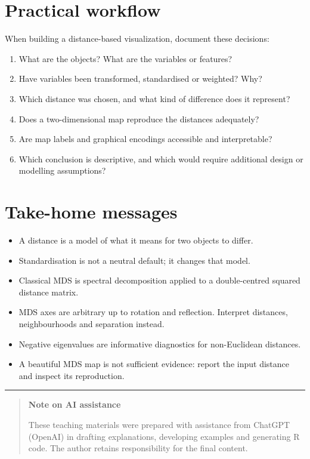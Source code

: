 \documentclass[
  english,
]{article}
\providecommand{\tightlist}{%
  \setlength{\itemsep}{0pt}\setlength{\parskip}{0pt}}
\begin{document}
\section{Practical workflow}\label{practical-workflow}

When building a distance-based visualization, document these decisions:

\begin{enumerate}
\def\labelenumi{\arabic{enumi}.}
\tightlist
\item
  What are the objects? What are the variables or features?
\item
  Have variables been transformed, standardised or weighted? Why?
\item
  Which distance was chosen, and what kind of difference does it
  represent?
\item
  Does a two-dimensional map reproduce the distances adequately?
\item
  Are map labels and graphical encodings accessible and interpretable?
\item
  Which conclusion is descriptive, and which would require additional
  design or modelling assumptions?
\end{enumerate}

\section{Take-home messages}\label{take-home-messages}

\begin{itemize}
\tightlist
\item
  A distance is a model of what it means for two objects to differ.
\item
  Standardisation is not a neutral default; it changes that model.
\item
  Classical MDS is spectral decomposition applied to a double-centred
  squared distance matrix.
\item
  MDS axes are arbitrary up to rotation and reflection. Interpret
  distances, neighbourhoods and separation instead.
\item
  Negative eigenvalues are informative diagnostics for non-Euclidean
  distances.
\item
  A beautiful MDS map is not sufficient evidence: report the input
  distance and inspect its reproduction.
\end{itemize}

\begin{center}\rule{0.5\linewidth}{0.5pt}\end{center}

\begin{quote}
\textbf{Note on AI assistance}

These teaching materials were prepared with assistance from ChatGPT
(OpenAI) in drafting explanations, developing examples and generating R
code. The author retains responsibility for the final content.
\end{quote}
\end{document}
